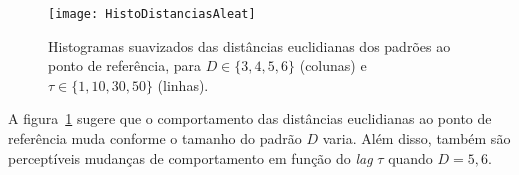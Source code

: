 %
%
%

\begin{figure}[hbt]
\centering
\texttt{[image: HistoDistanciasAleat]}
\caption{Histogramas suavizados das distâncias euclidianas dos padrões ao ponto de referência, para $D\in\{3,4,5,6\}$ (colunas) e $\tau\in\{1,10,30,50\}$ (linhas).}\label{Fig:HistoDistanciasAleat}
\end{figure}

A figura~\ref{Fig:HistoDistanciasAleat} sugere que o comportamento das distâncias euclidianas ao ponto de referência muda conforme o tamanho do padrão $D$ varia.
Além disso, também são perceptíveis mudanças de comportamento em função do \textit{lag} $\tau$ quando $D=5,6$.




